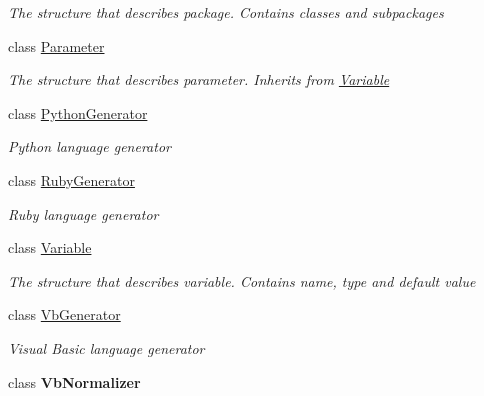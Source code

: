 \begin{DoxyCompactItemize}
\begin{DoxyCompactList}\small\item\em The structure that describes package. Contains classes and subpackages \end{DoxyCompactList}\item 
class \mbox{\hyperlink{classCodeGen_1_1generators_1_1Parameter}{Parameter}}
\begin{DoxyCompactList}\small\item\em The structure that describes parameter. Inherits from \mbox{\hyperlink{classCodeGen_1_1generators_1_1Variable}{Variable}} \end{DoxyCompactList}\item 
class \mbox{\hyperlink{classCodeGen_1_1generators_1_1PythonGenerator}{Python\+Generator}}
\begin{DoxyCompactList}\small\item\em Python language generator \end{DoxyCompactList}\item 
class \mbox{\hyperlink{classCodeGen_1_1generators_1_1RubyGenerator}{Ruby\+Generator}}
\begin{DoxyCompactList}\small\item\em Ruby language generator \end{DoxyCompactList}\item 
class \mbox{\hyperlink{classCodeGen_1_1generators_1_1Variable}{Variable}}
\begin{DoxyCompactList}\small\item\em The structure that describes variable. Contains name, type and default value \end{DoxyCompactList}\item 
class \mbox{\hyperlink{classCodeGen_1_1generators_1_1VbGenerator}{Vb\+Generator}}
\begin{DoxyCompactList}\small\item\em Visual Basic language generator \end{DoxyCompactList}\item 
class {\bfseries Vb\+Normalizer}
\end{DoxyCompactItemize}
